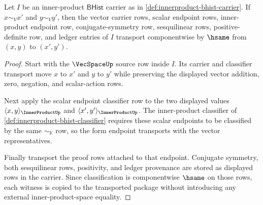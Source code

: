 \begin{theorem}
\label{thm:innerproduct-carrier-transport-obligation}
Let $I$ be an inner-product $\mathsf{BHist}$ carrier as in
\autoref{def:innerproduct-bhist-carrier}. If $x\sim_V x'$ and $y\sim_V y'$,
then the vector carrier rows, scalar endpoint rows, inner-product endpoint
row, conjugate-symmetry row, sesquilinear rows, positive-definite row, and
ledger entries of $I$ transport componentwise by $\hsame$ from $(x,y)$ to
$(x',y')$.
\end{theorem}
\begin{proof}
Start with the $\VecSpaceUp$ source row inside $I$. Its carrier and classifier
transport move $x$ to $x'$ and $y$ to $y'$ while preserving the displayed
vector addition, zero, negation, and scalar-action rows.

Next apply the scalar endpoint classifier row to the two displayed values
$\langle x,y\rangle_{\InnerProductUp}$ and
$\langle x',y'\rangle_{\InnerProductUp}$. The inner-product classifier of
\autoref{def:innerproduct-bhist-classifier} requires these scalar endpoints to
be classified by the same $\sim_{\mathbb{K}}$ row, so the form endpoint
transports with the vector representatives.

Finally transport the proof rows attached to that endpoint. Conjugate
symmetry, both sesquilinear rows, positivity, and ledger provenance are stored
as displayed rows in the carrier. Since classification is componentwise
$\hsame$ on those rows, each witness is copied to the transported package
without introducing any external inner-product-space equality.
\end{proof}

